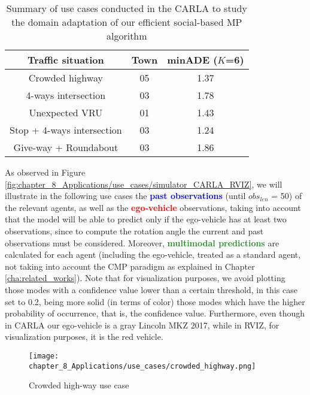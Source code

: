 \begin{table}[!tpbh]
	\centering
	\captionsetup{justification=justified}
	\caption{Summary of use cases conducted in the \ac{CARLA} to study the domain adaptation of our efficient social-based \ac{MP} algorithm}
	\label{table:8_carla_use_cases}
	\begin{tabular}{c|c|c}
		\toprule
		\textbf{Traffic situation} & \textbf{Town} & \textbf{\ac{minADE}} ($K$=6) \\
		\midrule
		Crowded highway & 05 & 1.37 \\
		4-ways intersection & 03 & 1.78 \\
		Unexpected \ac{VRU} & 01 & 1.43 \\
		Stop + 4-ways intersection & 03 & 1.24 \\
		Give-way + Roundabout & 03 & 1.86 \\
		\bottomrule
	\end{tabular}
\end{table} 

As observed in Figure \ref{fig:chapter_8_Applications/use_cases/simulator_CARLA_RVIZ}, we will illustrate in the following use cases the \textbf{\textcolor{blue}{past observations}} (until \textit{$obs_{len}$} = 50) of the relevant agents, as well as the \textbf{\textcolor{red}{ego-vehicle}} observations, taking into account that the model will be able to predict only if the ego-vehicle has at least two observations, since to compute the rotation angle the current and past observations must be considered. Moreover, \textbf{\textcolor{ForestGreen}{multimodal predictions}} are calculated for each agent (including the ego-vehicle, treated as a standard agent, not taking into account the \ac{CMP} paradigm as explained in Chapter \ref{cha:related_works}). Note that for visualization purposes, we avoid plotting those modes with a confidence value lower than a certain threshold, in this case set to 0.2, being more solid (in terms of color) those modes which have the higher probability of occurrence, that is, the confidence value. Furthermore, even though in \ac{CARLA} our ego-vehicle is a gray Lincoln MKZ 2017, while in \ac{RVIZ}, for visualization purposes, it is the red vehicle.

\begin{figure}[!h]
	\centering
	\texttt{[image: chapter\_8\_Applications/use\_cases/crowded\_highway.png]}
	\caption{Crowded high-way use case}
	\label{fig:chapter_8_Applications/use_cases/crowded_highway}
\end{figure}

